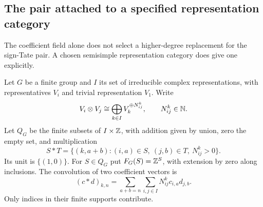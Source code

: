 \subsection{The pair attached to a specified representation category}
The coefficient field alone does not select a higher-degree replacement for the sign-Tate pair. A chosen semisimple representation category does give one explicitly.

Let $G$ be a finite group and $I$ its set of irreducible complex representations, with representatives $V_i$ and trivial representation $V_1$. Write
\[
 V_i\otimes V_j\cong\bigoplus_{k\in I} V_k^{\oplus N_{ij}^k},
 \qquad N_{ij}^k\in\mathbb N.
\]
Let $Q_G$ be the finite subsets of $I\times\mathbb Z$, with addition given by union, zero the empty set, and multiplication
\[
 S*T=\{(k,a+b): (i,a)\in S,\ (j,b)\in T,\ N_{ij}^k>0\}.
\]
Its unit is $\{(1,0)\}$. For $S\in Q_G$ put $F_G(S)=\mathbb Z^S$, with extension by zero along inclusions. The convolution of two coefficient vectors is
\[
 (c*d)_{k,n}=\sum_{a+b=n}\sum_{i,j\in I}N_{ij}^k c_{i,a}d_{j,b}.
\]
Only indices in their finite supports contribute.

